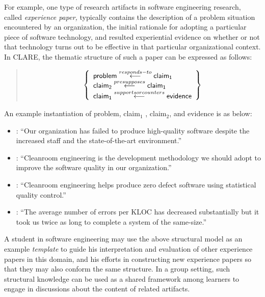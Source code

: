 For example, one type of research artifacts in software engineering
research, called {\it experience paper,\/} typically contains the
description of a problem situation encountered by an organization, the
initial rationale for adopting a particular piece of software technology,
and resulted experiential evidence on whether or not that technology turns
out to be effective in that particular organizational context. In CLARE,
the thematic structure of such a paper can be expressed as follows:

\begin{quotation}
  \[ \left\{
\begin{array}{l}
  {\sf problem} \stackrel{ responds-to}{\longleftarrow} {\sf
   claim_{1}} \\

   {\sf  claim_{2}} \stackrel{presupposes}{\longleftarrow} {\sf
  claim_{1}} \\
  {\sf claim_{1} } \stackrel{supports or counters}{\longleftarrow} {\sf evidence} \\
\end{array} 
   \right \} \]
\end{quotation}

An example instantiation of {\sf problem}, {\sf
 claim\(_{1} \) }, {\sf  claim\(_{2} \)}, and {\sf
evidence\/} is as below:

\begin{itemize}
\item {}: ``Our organization has failed to produce
  high-quality software despite the increased staff and the
  state-of-the-art environment.''
  
\item {}: ``Cleanroom engineering is the
  development methodology we should adopt to improve the software quality
  in our organization.''
  
\item {}: ``Cleanroom engineering helps produce
  zero defect software using statistical quality control.'' 
  
\item {}: ``The average number of errors per KLOC
  has decreased substantially but it took us twice as long to complete a
  system of the same-size.''
\end{itemize}

A student in software engineering may use the above structural model as an
example {\it template\/} to guide his interpretation and evaluation of
other experience papers in this domain, and his efforts in constructing new
experience papers so that they may also conform the same structure. In a
group setting, such structural knowledge can be used as a shared framework
among learners to engage in discussions about the content of related
artifacts.

